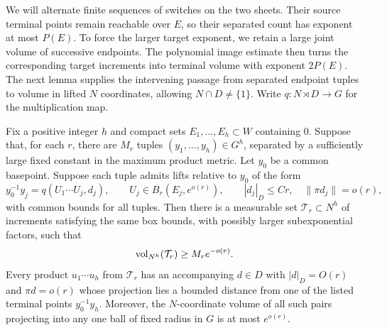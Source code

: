 We will alternate finite sequences of switches on the two sheets.
Their source terminal points remain reachable over $E$, so their
separated count has exponent at most $P(E)$.  To force the larger
target exponent, we retain a large joint volume of successive endpoints.
The polynomial image estimate then turns the corresponding target
increments into terminal volume with exponent $2P(E)$.  The next lemma
supplies the intervening passage from separated endpoint tuples to
volume in lifted $N$ coordinates, allowing $N\cap D\ne\{1\}$.
Write $q:N\rtimes D\to G$ for the multiplication map.

\begin{lemma}\label{lem:tuple-lift-volume}
Fix a positive integer $h$ and compact sets $E_1,\ldots,E_h\subset W$
containing $0$.  Suppose that, for each $r$, there are $M_r$ tuples
$(y_1,\ldots,y_h)\in G^h$, separated by a sufficiently large fixed
constant in the maximum product metric.  Let $y_0$ be a common basepoint.
Suppose each tuple admits lifts relative to $y_0$ of the form
\[
 y_0^{-1}y_j=q(U_1\cdots U_j,d_j),\qquad
 U_j\in B_r(E_j,e^{o(r)}),\qquad
 |d_j|_D\leq Cr,\quad \|\pi d_j\|=o(r),
\]
with common bounds for all tuples.  Then there is a measurable set
$\mathcal T_r\subset N^h$ of increments satisfying the same box bounds,
with possibly larger subexponential factors, such that
\begin{equation}\label{eq:tuple-lift-volume}
 \operatorname{vol}_{N^h}(\mathcal T_r)\geq M_r e^{-o(r)}.
\end{equation}
Every product $u_1\cdots u_h$ from $\mathcal T_r$ has an accompanying
$d\in D$ with $|d|_D=O(r)$ and $\pi d=o(r)$ whose projection lies a
bounded distance from one of the listed terminal points $y_0^{-1}y_h$.
Moreover, the $N$-coordinate volume of all such pairs projecting into any
one ball of fixed radius in $G$ is at most $e^{o(r)}$.
\end{lemma}

